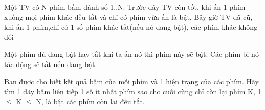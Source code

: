 Một TV có N phím bấm đánh số 1..N. Trước đây TV còn tốt, khi ấn 1 phím xuống mọi phím khác đều tắt và chỉ có phím vừa ấn là bật. Bây giờ TV đã cũ, khi ấn 1 phím,chỉ có 1 số phím khác tắt(nếu nó đang bật), các phím khác không đổi  

   Một phím dù đang bật hay tắt khi ta ấn nó thì phím này sẽ bật. Các phím bị nó tác động sẽ tắt nếu đang bật.  

   Bạn được cho biết kết quả bấm của mỗi phím và 1 hiện trạng của các phím. Hãy tìm 1 dãy bấm liên tiếp 1 số ít nhất phím sao cho cuối cùng chỉ còn lại phím K, 1  $\le$  K  $\le$  N, là bật các phím còn lại đều tắt.  

\